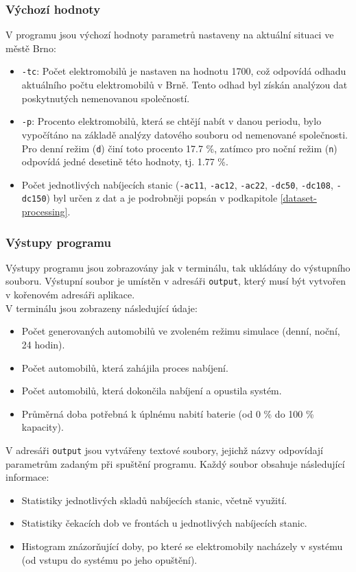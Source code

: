 \documentclass[a4paper,11pt]{article}
\begin{document}
\subsubsection{Výchozí hodnoty}
V programu jsou výchozí hodnoty parametrů nastaveny na aktuální situaci ve městě Brno:
\begin{itemize}

    \item \texttt{-tc}: Počet elektromobilů je nastaven na hodnotu 1700, což odpovídá odhadu aktuálního počtu elektromobilů v Brně. Tento odhad byl získán analýzou dat poskytnutých nemenovanou společností.
    \item \texttt{-p}: Procento elektromobilů, která se chtějí nabít v danou periodu, bylo vypočítáno na základě analýzy datového souboru od nemenované společnosti. Pro denní režim (\texttt{d}) činí toto procento 17.7 \%, zatímco pro noční režim (\texttt{n}) odpovídá jedné desetině této hodnoty, tj. 1.77 \%.
    \item Počet jednotlivých nabíjecích stanic (\texttt{-ac11}, \texttt{-ac12}, \texttt{-ac22}, \texttt{-dc50}, \texttt{-dc108}, \texttt{-dc150}) byl určen z dat a je podrobněji popsán v podkapitole \ref{dataset-processing}.
\end{itemize}

\subsubsection{Výstupy programu}

Výstupy programu jsou zobrazovány jak v terminálu, tak ukládány do výstupního souboru. Výstupní soubor je umístěn v adresáři \texttt{output}, který musí být vytvořen v kořenovém adresáři aplikace.\\

V terminálu jsou zobrazeny následující údaje:
\begin{itemize}
    \item Počet generovaných automobilů ve zvoleném režimu simulace (denní, noční, 24 hodin).
    \item Počet automobilů, která zahájila proces nabíjení.
    \item Počet automobilů, která dokončila nabíjení a opustila systém.
    \item Průměrná doba potřebná k úplnému nabití baterie (od 0 \% do 100 \% kapacity).\\
\end{itemize}

V adresáři \texttt{output} jsou vytvářeny textové soubory, jejichž názvy odpovídají parametrům zadaným při spuštění programu. Každý soubor obsahuje následující informace:
\begin{itemize}
    \item Statistiky jednotlivých skladů nabíjecích stanic, včetně využití.
    \item Statistiky čekacích dob ve frontách u jednotlivých nabíjecích stanic.
    \item Histogram znázorňující doby, po které se elektromobily nacházely v systému (od vstupu do systému po jeho opuštění).
\end{itemize}
\end{document}
